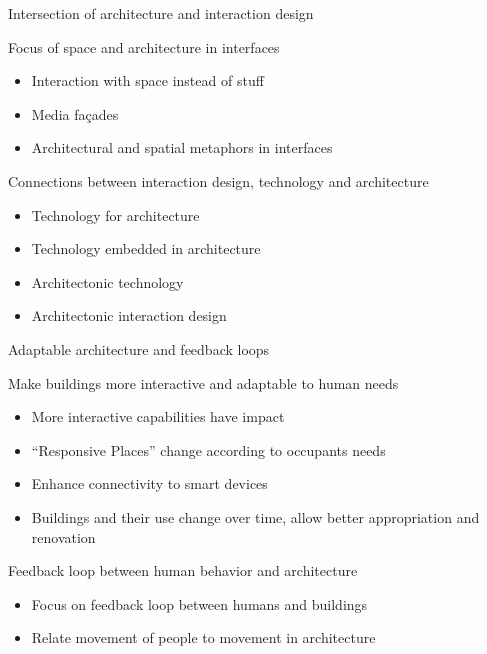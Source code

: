 \documentclass[10pt]{beamer}
\begin{document}
\begin{frame}{Intersection of architecture and interaction design}
	\begin{block}{Focus of space and architecture in interfaces}
	\begin{itemize}
        \pause{}
		\item Interaction with space instead of stuff
        \pause{}
		\item Media fa\c{c}ades
        \pause{}
		\item Architectural and spatial metaphors in interfaces
    \end{itemize}	
	\end{block}

    \pause{}
	\begin{block}{Connections between interaction design, technology and architecture}
	\begin{itemize}
        \pause{}
		\item Technology for architecture
        \pause{}
		\item Technology embedded in architecture
        \pause{}
		\item Architectonic technology
        \pause{}
        \item Architectonic interaction design
	\end{itemize}	
	\end{block}
\end{frame}


\begin{frame}{Adaptable architecture and feedback loops}
	\begin{block}{Make buildings more interactive and adaptable to human needs}
	\begin{itemize}
        \pause{}
		\item More interactive capabilities have impact
        \pause{}
		\item ``Responsive Places'' change according to occupants needs
        \pause{}
        \item Enhance connectivity to smart devices
        \pause{}
        \item Buildings and their use change over time, allow better appropriation and renovation
	\end{itemize}	
	\end{block}

    \pause{}
	\begin{block}{Feedback loop between human behavior and architecture}
	\begin{itemize}
        \pause{}
		\item Focus on feedback loop between humans and buildings
        \pause{}
		\item Relate movement of people to movement in architecture
	\end{itemize}	
	\end{block}

\end{frame}
\end{document}
